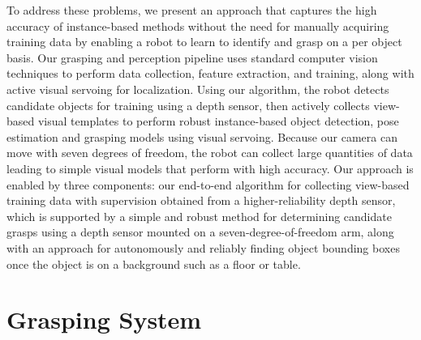 \documentclass[graybox]{svmult}
\begin{document}
To address these problems, we present an approach that captures the
high accuracy of instance-based methods without the need for manually
acquiring training data by enabling a robot to learn to identify and
grasp on a per object basis. Our grasping and perception pipeline uses
standard computer vision techniques to perform data collection,
feature extraction, and training, along with active visual servoing
for localization.  Using our algorithm, the robot detects candidate
objects for training using a depth sensor, then actively collects
view-based visual templates to perform robust instance-based object
detection, pose estimation and grasping models using visual servoing.
Because our camera can move with seven degrees of freedom, the robot
can collect large quantities of data leading to simple visual models
that perform with high accuracy.  Our approach is enabled by three
components: our end-to-end algorithm for collecting view-based
training data with supervision obtained from a higher-reliability
depth sensor, which is supported by a simple and robust method for
determining candidate grasps using a depth sensor mounted on a
seven-degree-of-freedom arm, along with an approach for autonomously
and reliably finding object bounding boxes once the object is on a
background such as a floor or table.



\section{Grasping System}
\end{document}
